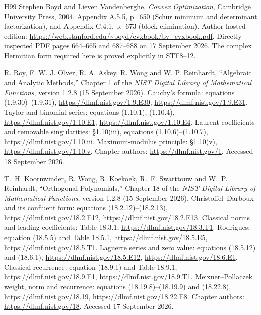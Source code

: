 \begin{thebibliography}{H99}
Stephen Boyd and Lieven Vandenberghe,
\emph{Convex Optimization}, Cambridge University Press, 2004.
Appendix A.5.5, p.~650 (Schur minimum and determinant factorization),
and Appendix C.4.1, p.~673 (block elimination).
Author-hosted edition: \url{https://web.stanford.edu/~boyd/cvxbook/bv_cvxbook.pdf}.
Directly inspected PDF pages 664--665 and 687--688 on 17 September 2026.
The complex Hermitian form required here is proved explicitly in STF8--12.


R. Roy, F. W. J. Olver, R. A. Askey, R. Wong and W. P. Reinhardt,
``Algebraic and Analytic Methods,'' Chapter 1 of the
\emph{NIST Digital Library of Mathematical Functions},
version 1.2.8 (15 September 2026).
Cauchy's formula: equations (1.9.30)--(1.9.31),
\url{https://dlmf.nist.gov/1.9.E30},
\url{https://dlmf.nist.gov/1.9.E31}.
Taylor and binomial series: equations (1.10.1), (1.10.4),
\url{https://dlmf.nist.gov/1.10.E1},
\url{https://dlmf.nist.gov/1.10.E4}.
Laurent coefficients and removable singularities: \S1.10(iii),
equations (1.10.6)--(1.10.7),
\url{https://dlmf.nist.gov/1.10.iii}.
Maximum-modulus principle: \S1.10(v),
\url{https://dlmf.nist.gov/1.10.v}.
Chapter authors: \url{https://dlmf.nist.gov/1}.
Accessed 18 September 2026.


T.~H. Koornwinder, R. Wong, R. Koekoek, R.~F. Swarttouw and
W.~P. Reinhardt,
``Orthogonal Polynomials,'' Chapter 18 of the
\emph{NIST Digital Library of Mathematical Functions},
version 1.2.8 (15 September 2026).
Christoffel--Darboux and its confluent form: equations (18.2.12)--(18.2.13),
\url{https://dlmf.nist.gov/18.2.E12},
\url{https://dlmf.nist.gov/18.2.E13}.
Classical norms and leading coefficients: Table 18.3.1,
\url{https://dlmf.nist.gov/18.3.T1}.
Rodrigues: equation (18.5.5) and Table 18.5.1,
\url{https://dlmf.nist.gov/18.5.E5},
\url{https://dlmf.nist.gov/18.5.T1}.
Laguerre series and zero value: equations (18.5.12) and (18.6.1),
\url{https://dlmf.nist.gov/18.5.E12},
\url{https://dlmf.nist.gov/18.6.E1}.
Classical recurrence: equation (18.9.1) and Table 18.9.1,
\url{https://dlmf.nist.gov/18.9.E1},
\url{https://dlmf.nist.gov/18.9.T1}.
Meixner--Pollaczek weight, norm and recurrence:
equations (18.19.8)--(18.19.9) and (18.22.8),
\url{https://dlmf.nist.gov/18.19},
\url{https://dlmf.nist.gov/18.22.E8}.
Chapter authors: \url{https://dlmf.nist.gov/18}.
Accessed 17 September 2026.



\end{thebibliography}

